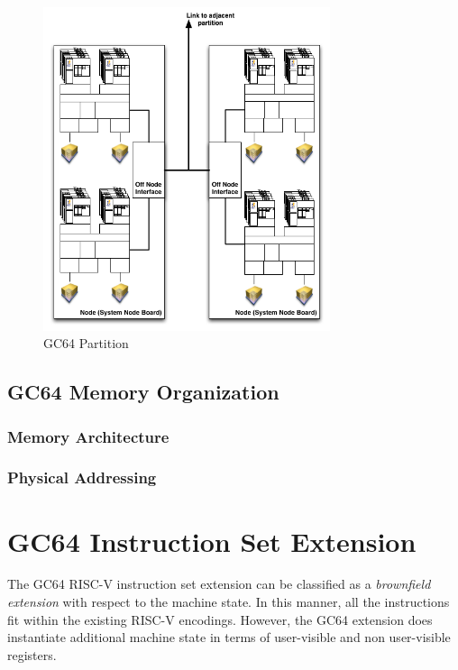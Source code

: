 \documentclass{article}
\begin{document}
\begin{figure}[h!]
\begin{center}
\includegraphics[width=0.75\textwidth]{gc64-partition.png}
\caption{GC64 Partition}
\end{center}
\label{figure:partition}
\end{figure} 

\subsection{GC64 Memory Organization}

\subsubsection{Memory Architecture}

\subsubsection{Physical Addressing}

\section{GC64 Instruction Set Extension}

The GC64 RISC-V instruction set extension can be classified as a \emph{brownfield extension} with respect to the machine state.  In this manner, all the instructions fit within the existing RISC-V encodings.  However, the GC64 extension does instantiate additional machine state in terms of user-visible and non user-visible registers.  
\end{document}

